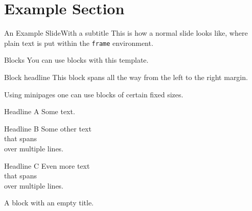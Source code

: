 %
%
%

\section{Example Section}
\begin{frame}[t]{An Example Slide}{With a subtitle}
This is how a normal slide looks like, where plain text is put within the \texttt{frame} environment.
\end{frame}
%
%
%
%
%
\begin{frame}[t]{Blocks}{}
You can use blocks with this template.
\begin{block}{Block headline}
This block spans all the way from the left to the right margin.
\end{block}
Using minipages one can use blocks of certain fixed sizes.\\
%
\noindent%
\begin{minipage}[t]{0.45\textwidth}
\begin{block}{Headline A}
Some text.
\end{block}
\end{minipage}
\hfill%
\begin{minipage}[t]{0.2\textwidth}
\begin{block}{Headline B}
Some other text\\
that spans\\
over multiple lines.
\end{block}
\end{minipage}
\hfill%
\begin{minipage}[t]{0.2\textwidth}
\begin{block}{Headline C}
Even more text\\
that spans\\
over multiple lines.
\end{block}
\end{minipage}

\begin{block}{}
A block with an empty title.
\end{block}

\end{frame}

